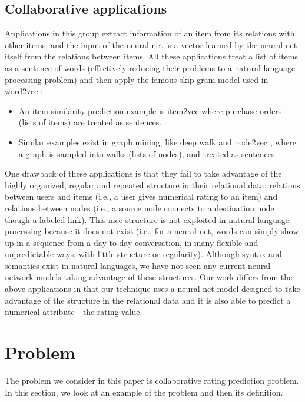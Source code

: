 \documentclass[twocolumn]{article}
\begin{document}
\subsection{Collaborative applications}
Applications in this group extract information of an item from its relations 
with other items, and the input of the neural net is a vector learned by the 
neural net itself from the relations between items.
All these applications treat a list of items as a sentence of words 
(effectively reducing their problems to a natural language processing problem)  
and then apply the famous skip-gram model used in word2vec 
\cite{mikolov2013efficient}:
\begin{itemize}
	\item An item similarity prediction example is item2vec 
	\cite{barkan2016item2vec} where purchase orders (lists of items) are 
	treated as sentences.
	\item Similar examples exist in graph mining, like deep walk 
	\cite{perozzi2014deepwalk} and node2vec \cite{grovernode2vec}, where a 
	graph is sampled into walks (lists of nodes), and treated as sentences.
\end{itemize}
One drawback of these applications is that they fail to take advantage of 
the highly organized, regular and repeated structure in their relational data: 
relations between users and items (i.e., a user gives numerical rating to an 
item) and relations between nodes (i.e., a source node connects to a 
destination node though a labeled link).
This nice structure is not exploited in natural language processing because it 
does not exist (i.e., for a neural net, words can simply show up in a sequence 
from a day-to-day conversation, in many flexible and unpredictable ways, with 
little structure or regularity).
Although syntax and semantics exist in natural languages, we have not seen any 
current neural network models taking advantage of these structures.
Our work differs from the above applications in that our technique uses a 
neural net model designed to take advantage of the structure in the relational 
data and it is also able to predict a numerical attribute - the rating value.

\section{Problem}
The problem we consider in this paper is collaborative rating prediction 
problem.
In this section, we look at an example of the problem and then its definition.
\end{document}
